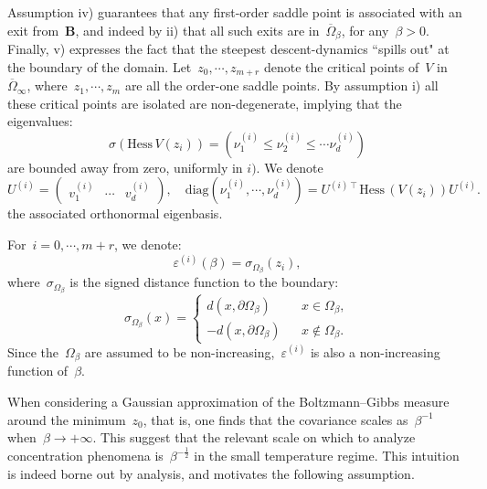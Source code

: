 \documentclass[10pt]{article}
\newcommand{\Hess}{\mathrm{Hess}\,}
\newcommand{\1}{\mathbbm 1}
\newcommand{\epsBoundary}[1]{\varepsilon^{(#1)}} %
\newcommand{\hessPassage}[2][]{U^{(#2)#1}} %
\newcommand{\hessEigvec}[2]{v^{(#1)}_{#2}} %
\newcommand{\hessEigval}[2]{\nu^{(#1)}_{#2}} %
\newcommand{\varepsiloni}{\varepsilon^{(i)}}
\begin{document}
    Assumption iv) guarantees that any first-order saddle point is associated with an exit from~$\mathbf B$, and indeed by ii) that all such exits are in~$\overline\Omega_\beta$, for any~$\beta>0$.
    Finally, v) expresses the fact that the steepest descent-dynamics ``spills out" at the boundary of the domain.
    Let~$z_0,\dotsm,z_{m+r}$ denote the critical points of~$V$ in~$\overline{\Omega}_\infty$, where~$z_1,\dotsm,z_m$ are all the order-one saddle points. 
    By assumption i) all these critical points are isolated are non-degenerate, implying that the eigenvalues:
    \begin{equation}
        \label{eq:eigvals_hessian}
        \sigma(\Hess V(z_i)) = \left(\hessEigval{i}{1} \leq \hessEigval{i}{2} \leq \dotsm \hessEigval{i}{d}\right)
    \end{equation}
    are bounded away from zero, uniformly in $i)$. We denote
    \begin{equation}
        \label{eq:eigvecs_hessian}
        \hessPassage{i} =\begin{pmatrix}\hessEigvec{i}{1}&\dotsm&\hessEigvec{i}{d}\end{pmatrix},\quad \mathrm{diag}(\hessEigval{i}{1},\dotsm,\hessEigval{i}{d}) = \hessPassage[\intercal]{i} \Hess(V(z_i)) \hessPassage{i}.
    \end{equation}
    the associated orthonormal eigenbasis.

    For~$i=0,\dotsm,m+r$, we denote:
    \begin{equation}
        \label{eq:varepsilon}
        \epsBoundary{i}(\beta) = \sigma_{\Omega_\beta}\left(z_i\right),
    \end{equation}
    where~$\sigma_{\Omega_\beta}$ is the signed distance function to the boundary:
    \begin{equation}
        \sigma_{\Omega_\beta}(x) = \left\{\begin{aligned}
            d(x,\partial\Omega_\beta)&&x\in\Omega_\beta,\\
            -d(x,\partial\Omega_\beta)&&x\not\in\Omega_\beta.
        \end{aligned}\right.
    \end{equation}
    Since the~$\Omega_\beta$ are assumed to be non-increasing,~$\varepsiloni$ is also a non-increasing function of~$\beta$.

    When considering a Gaussian approximation of the Boltzmann--Gibbs measure around the minimum~$z_0$, that is, one finds that the covariance scales as~$\beta^{-1}$ when~$\beta\to+\infty$. This suggest that the relevant scale on which to analyze concentration phenomena is~$\beta^{-\frac 12}$ in the small temperature regime.
    This intuition is indeed borne out by analysis, and motivates the following assumption.
\end{document}
